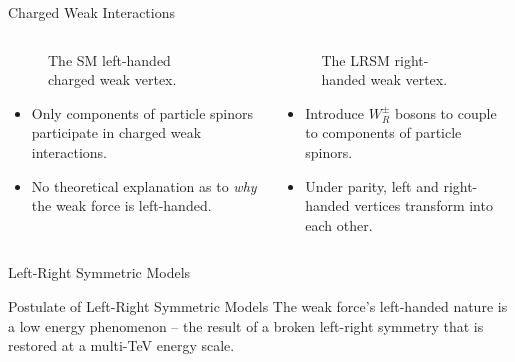 \documentclass[aspectratio=169]{beamer}
\begin{document}
\begin{frame}{Charged Weak Interactions}
  \begin{columns}
    \begin{column}{0.5\textwidth}
      \begin{figure}
        \centering
        
        \caption{The SM left-handed charged weak vertex.}
      \end{figure}
      \begin{itemize}
        \item Only  components of 
          particle spinors participate in charged weak interactions.
        \item No theoretical explanation as to \emph{why} 
          the weak force is left-handed.
      \end{itemize}
    \end{column}
    \begin{column}{0.5\textwidth}
      \begin{figure}
        \centering
        
        \caption{The LRSM right-handed weak vertex.}
      \end{figure}
      \begin{itemize}
        \item Introduce $W_{R}^{\pm}$ bosons to couple to  components of 
        particle spinors.
        \item Under parity, left and right-handed vertices transform into each other.
      \end{itemize}
    \end{column}
  \end{columns}
\end{frame}

\begin{frame}{Left-Right Symmetric Models}
  \begin{block}{Postulate of Left-Right Symmetric Models}
    The weak force's left-handed nature is a low energy phenomenon -- 
    the result of a broken left-right symmetry that is restored at a multi-TeV energy scale.
  \end{block}
  \vfill
  \begin{table}
    
    \caption{Summary of the Left-Right Symmetric SM
    with new extensions in \textcolor{red}{red}.}
  \end{table}
\end{frame}
\end{document}
